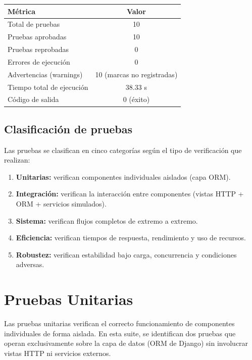\documentclass[12pt,a4paper]{article}
\begin{document}
\begin{center}
\begin{tabular}{lc}
\toprule
\textbf{Métrica}          & \textbf{Valor} \\
\midrule
Total de pruebas          & 10 \\
Pruebas aprobadas         & 10 \\
Pruebas reprobadas        & 0  \\
Errores de ejecución      & 0  \\
Advertencias (warnings)   & 10 (marcas no registradas) \\
Tiempo total de ejecución & 38.33 s \\
Código de salida          & 0 (éxito) \\
\bottomrule
\end{tabular}
\end{center}

\subsection{Clasificación de pruebas}

Las pruebas se clasifican en cinco categorías según el tipo de verificación que realizan:

\begin{enumerate}
  \item \textbf{Unitarias:} verifican componentes individuales aislados (capa ORM).
  \item \textbf{Integración:} verifican la interacción entre componentes (vistas HTTP + ORM + servicios simulados).
  \item \textbf{Sistema:} verifican flujos completos de extremo a extremo.
  \item \textbf{Eficiencia:} verifican tiempos de respuesta, rendimiento y uso de recursos.
  \item \textbf{Robustez:} verifican estabilidad bajo carga, concurrencia y condiciones adversas.
\end{enumerate}

\newpage
\section{Pruebas Unitarias}

Las pruebas unitarias verifican el correcto funcionamiento de componentes individuales
de forma aislada. En esta suite, se identifican dos pruebas que operan exclusivamente
sobre la capa de datos (ORM de Django) sin involucrar vistas HTTP ni servicios externos.
\end{document}
